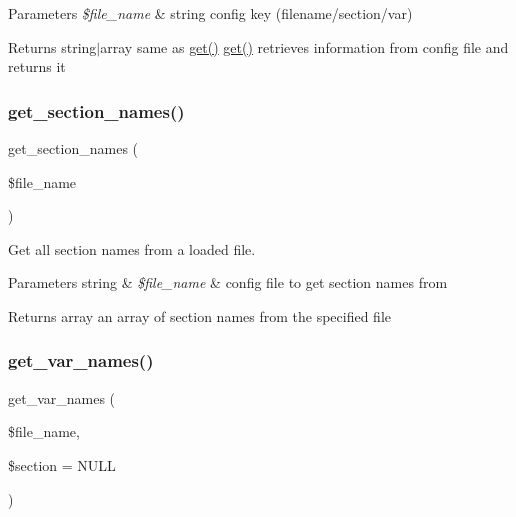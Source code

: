 \begin{DoxyParams}{Parameters}
{\em \$file\+\_\+name} & string config key (filename/section/var) \\
\hline
\end{DoxyParams}
\begin{DoxyReturn}{Returns}
string$\vert$array same as \mbox{\hyperlink{class_config___file_a23679231c0a913334b147f7df83c2a77}{get()}}  \mbox{\hyperlink{class_config___file_a23679231c0a913334b147f7df83c2a77}{get()}} retrieves information from config file and returns it 
\end{DoxyReturn}
\mbox{\label{class_config___file_a87a9f1ba0feaebb36833ffba7af5b398}} 
\subsubsection{\texorpdfstring{get\+\_\+section\+\_\+names()}{get\_section\_names()}}
{\footnotesize\ttfamily get\+\_\+section\+\_\+names (\begin{DoxyParamCaption}\item[{}]{\$file\+\_\+name }\end{DoxyParamCaption})}

Get all section names from a loaded file.


\begin{DoxyParams}[1]{Parameters}
string & {\em \$file\+\_\+name} & config file to get section names from \\
\hline
\end{DoxyParams}
\begin{DoxyReturn}{Returns}
array an array of section names from the specified file 
\end{DoxyReturn}
\mbox{\label{class_config___file_a1cc9733d0fbe7253d814110ee83ba385}} 
\subsubsection{\texorpdfstring{get\+\_\+var\+\_\+names()}{get\_var\_names()}}
{\footnotesize\ttfamily get\+\_\+var\+\_\+names (\begin{DoxyParamCaption}\item[{}]{\$file\+\_\+name,  }\item[{}]{\$section = {\ttfamily NULL} }\end{DoxyParamCaption})}

